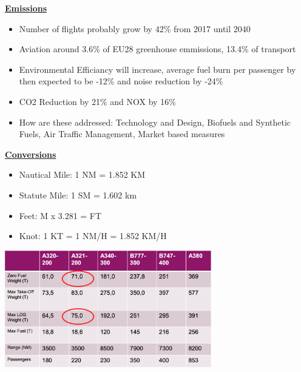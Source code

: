 \documentclass[9pt, landscape, fleqn]{scrartcl}
\begin{document}
\begin{multicols*}{3}
\underline{\textbf{Emissions}}
\begin{itemize}
    \item Number of flights probably grow by 42\% from 2017 until 2040
    \item Aviation around 3.6\% of EU28 greenhouse emmissions, 13.4\% of transport
    \item Environmental Efficiancy will increase, average fuel burn per passenger by then expected to be -12\% and noise reduction by -24\%
    \item CO2 Reduction by 21\% and NOX by 16\%
    \item How are these addressed: Technology and Design, Biofuels and Synthetic Fuels, Air Traffic Management, Market based measures
\end{itemize}
\underline{\textbf{Conversions}}
\begin{itemize}
    \item Nautical Mile: 1 NM = 1.852 KM 
    \item Statute Mile: 1 SM = 1.602 km
    \item Feet: M x 3.281 = FT 
    \item Knot: 1 KT = 1 NM/H = 1.852 KM/H
\end{itemize}
\begin{center}
    \includegraphics[width=9cm]{Images/Weights.png}
\end{center}
\newpage

\end{multicols*}
\end{document}
